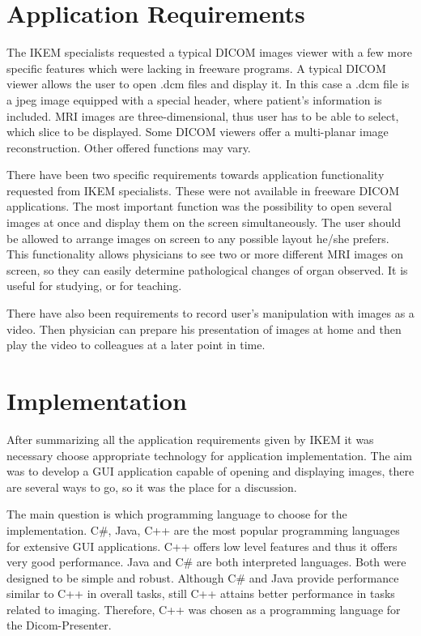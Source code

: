 \section{Application Requirements}
\label{requirements}
The IKEM specialists requested a typical DICOM images viewer with a few more specific features which were lacking in freeware programs. A typical DICOM viewer allows the user to open .dcm files and display it. In this case a .dcm file is a jpeg image equipped with a special header, where patient's information is included. MRI images are three-dimensional, thus user has to be able to select, which slice to be displayed. Some DICOM viewers offer a multi-planar image reconstruction. Other offered functions may vary.

There have been two specific requirements towards application functionality requested from IKEM specialists. These were not available in freeware DICOM applications. The most important function was the possibility to open several images at once and display them on the screen simultaneously. The user should be allowed to arrange images on screen to any possible layout he/she prefers. This functionality allows physicians to see two or more different MRI images on screen, so they can easily determine pathological changes of organ observed. It is useful for studying, or for teaching.

There have also been requirements to record user's manipulation with images as a video. Then physician can prepare his presentation of images at home and then play the video to colleagues at a later point in time.

\section{Implementation}
After summarizing all the application requirements given by IKEM it was necessary choose appropriate technology for application implementation. The aim was to develop a GUI application capable of opening and displaying images, there are several ways to go, so it was the place for a discussion. 

The main question is which programming language to choose for the implementation. C\#, Java, C++ are the most popular programming languages for extensive GUI applications. C++ offers low level features and thus it offers very good performance. Java and C\# are both interpreted languages. Both were designed to be simple and robust. Although C\# and Java provide performance similar to C++ in overall tasks, still C++ attains better performance in tasks related to imaging\cite[Chapter~14]{csharpjavaperformance}. Therefore, C++ was chosen as a programming language for the Dicom-Presenter.

